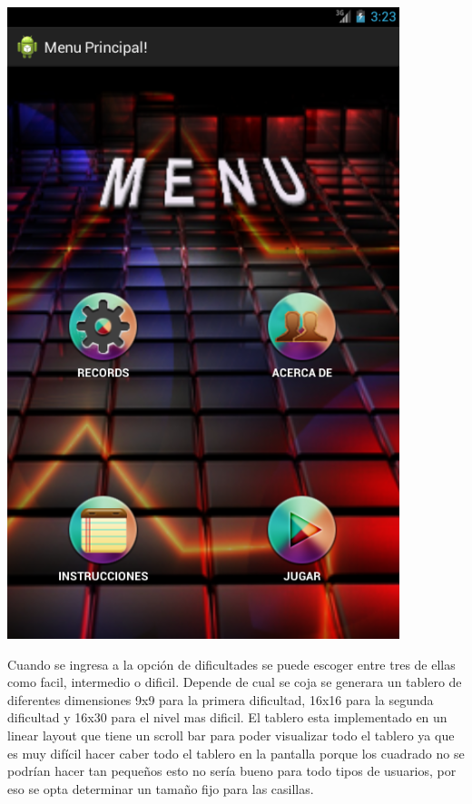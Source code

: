 \begin{center}
\includegraphics{image_buscamina/pantallaMenu}



\end{center}


Cuando se ingresa a la opción de dificultades se puede escoger entre tres de ellas como facil, intermedio o dificil. Depende de cual se coja se generara un tablero de diferentes dimensiones 9x9 para la primera dificultad, 16x16 para la segunda dificultad y 16x30 para el nivel mas dificil. El tablero esta implementado en un linear layout que tiene un scroll bar para poder visualizar todo el tablero ya que es muy difícil hacer caber todo el tablero en la pantalla porque los cuadrado no se podrían hacer tan pequeños esto no sería bueno para todo tipos de usuarios, por eso se opta determinar un tamaño fijo para las casillas.

